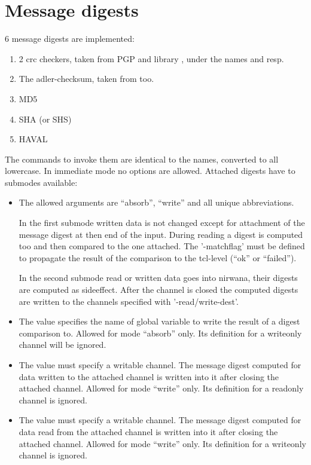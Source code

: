 \section {Message digests}

6 message digests are implemented:

\begin {enumerate}
\item	2 crc checkers, taken from PGP and library , under
	the names  and  resp.
\item	The adler-checksum, taken from  too.
\item	MD5
\item	SHA (or SHS)
\item	HAVAL
\end   {enumerate}

The commands to invoke them are identical to the names, converted to
all lowercase. In immediate mode no options are allowed. Attached
digests have to submodes available:

\begin {itemize}
\item[-mode]	The allowed arguments are ``absorb'', ``write'' and
		all unique abbreviations.

		In the first submode written data is not changed
		except for attachment of the message digest at then
		end of the input. During reading a digest is computed
		too and then compared to the one attached. The
		'-matchflag' must be defined to propagate the result
		of the comparison to the tcl-level (``ok'' or ``failed'').

		In the second submode read or written data goes into
		nirwana, their digests are computed as
		sideeffect. After the channel is closed the computed
		digests are written to the channels specified with
		'-read/write-dest'.

\item[-matchflag]	The value specifies the name of global
			variable to write the result of a digest
			comparison to. Allowed for mode ``absorb''
			only. Its definition for a writeonly channel
			will be ignored.

\item[-write-dest]	The value must specify a writable channel. The
			message digest computed for data written to
			the attached channel is written into it after
			closing the attached channel. Allowed for mode
			``write'' only. Its definition for a readonly
			channel is ignored.

\item[-read-dest]	The value must specify a writable channel. The
			message digest computed for data read from
			the attached channel is written into it after
			closing the attached channel. Allowed for mode
			``write'' only. Its definition for a writeonly
			channel is ignored.
\end   {itemize}


